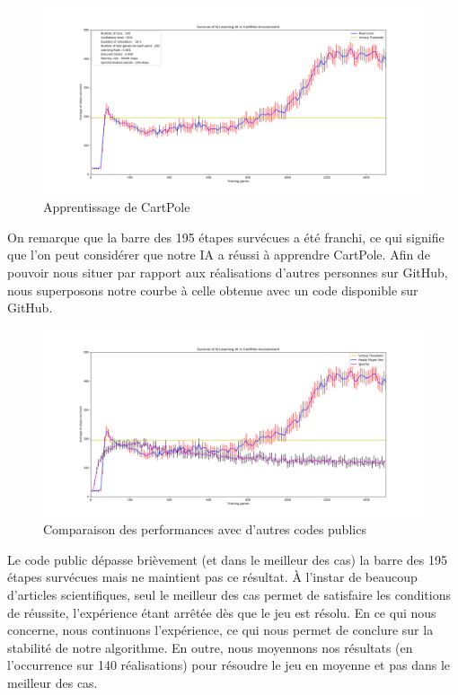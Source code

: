 \begin{figure}[h]
 \centering
 \includegraphics[width  = \textwidth]{img/cartpole_2reseaux.png}
 \caption{Apprentissage de CartPole}
 \label{fig:cartpole-2reseaux}
\end{figure}


On remarque que la barre des 195 étapes survécues a été franchi, ce qui signifie que l'on peut considérer que notre IA a réussi à apprendre CartPole.
Afin de pouvoir nous situer par rapport aux réalisations d'autres personnes sur GitHub, nous superposons notre courbe à celle obtenue avec un code disponible
sur GitHub.

\begin{figure}[h]
 \centering
 \includegraphics[width  = \textwidth]{img/gsurma.png}
 \caption{Comparaison des performances avec d'autres codes publics}
 \label{fig:gsurma}
\end{figure}

Le code public dépasse brièvement (et dans le meilleur des cas) la barre des 195 étapes survécues mais ne maintient pas ce résultat.
À l'instar de beaucoup d'articles scientifiques, seul le meilleur des cas permet de satisfaire les conditions de réussite, l'expérience étant arrêtée dès
que le jeu est résolu. En ce qui nous concerne, nous continuons l'expérience, ce qui nous permet de conclure sur la stabilité de notre algorithme. En outre,
nous moyennons nos résultats (en l'occurrence sur 140 réalisations) pour résoudre le jeu en moyenne et pas dans le meilleur des cas.

